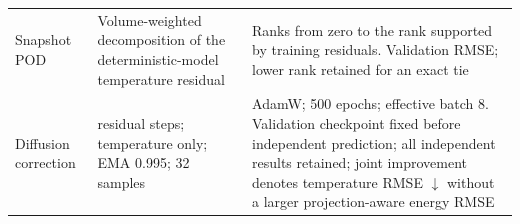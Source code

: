 \begin{table}[htbp]
\begin{tabular}{>{\raggedright\arraybackslash}p{2.4cm}>{\raggedright\arraybackslash}p{5.2cm}>{\raggedright\arraybackslash}p{5.0cm}}
Snapshot POD \cite{sirovich1987pod} & Volume-weighted decomposition of the deterministic-model temperature residual & Ranks from zero to the rank supported by training residuals. Validation RMSE; lower rank retained for an exact tie \\
Diffusion correction \cite{lippe2023pderefiner} & 3 residual steps; temperature only; EMA 0.995; 32 samples & AdamW; 500 epochs; effective batch 8. Validation checkpoint fixed before independent prediction; all independent results retained; joint improvement denotes temperature RMSE $\downarrow$ without a larger projection-aware energy RMSE \\
\bottomrule
\end{tabular}
\end{table}
